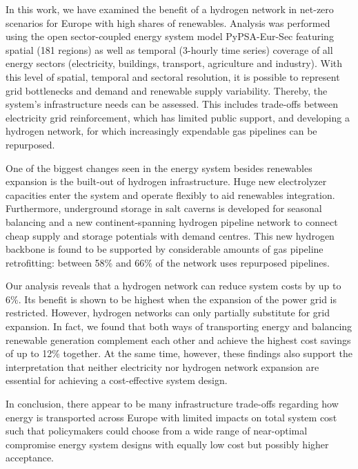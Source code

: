 In this work, we have examined the benefit of a hydrogen network in net-zero \co
scenarios for Europe with high shares of renewables. Analysis was performed
using the open sector-coupled energy system model PyPSA-Eur-Sec featuring
spatial (181 regions) as well as temporal (3-hourly time series) coverage of all
energy sectors (electricity, buildings, transport, agriculture and industry).
With this level of spatial, temporal and sectoral resolution, it is possible to
represent grid bottlenecks and demand and renewable supply variability. Thereby,
the system's infrastructure needs can be assessed. This includes trade-offs
between electricity grid reinforcement, which has limited public support, and
developing a hydrogen network, for which increasingly expendable gas pipelines
can be repurposed.

One of the biggest changes seen in the energy system besides renewables
expansion is the built-out of hydrogen infrastructure. Huge new electrolyzer
capacities enter the system and operate flexibly to aid renewables integration.
Furthermore, underground storage in salt caverns is developed for seasonal
balancing and a new continent-spanning hydrogen pipeline network to connect
cheap supply and storage potentials with demand centres. This new hydrogen
backbone is found to be supported by considerable amounts of gas pipeline
retrofitting: between 58\% and 66\% of the network uses repurposed pipelines.

Our analysis reveals that a hydrogen network can reduce system costs by up to
6\%. Its benefit is shown to be highest when the expansion of the power grid is
restricted. However, hydrogen networks can only partially substitute for grid
expansion.  In fact, we found that both ways of transporting energy and balancing
renewable generation complement each other and achieve the highest cost savings
of up to 12\% together. At the same time, however, these findings also support
the interpretation that neither electricity nor hydrogen network expansion are
essential for achieving a cost-effective system design.

In conclusion, there appear to be many infrastructure trade-offs regarding how
energy is transported across Europe with limited impacts on total system cost
such that policymakers could choose from a wide range of near-optimal compromise
energy system designs with equally low cost but possibly higher acceptance.

